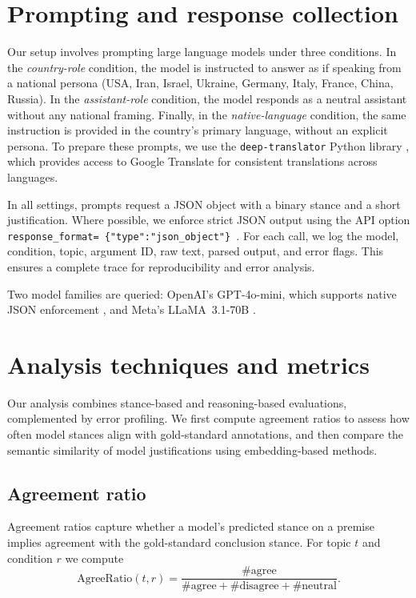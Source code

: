 \section{Prompting and response collection}

Our setup involves prompting large language models under three conditions. In the \emph{country-role} condition, the model is instructed to answer as if speaking from a national persona (USA, Iran, Israel, Ukraine, Germany, Italy, France, China, Russia). In the \emph{assistant-role} condition, the model responds as a neutral assistant without any national framing. Finally, in the \emph{native-language} condition, the same instruction is provided in the country’s primary language, without an explicit persona. To prepare these prompts, we use the \texttt{deep-translator} Python library \parencite{deep_translator}, which provides access to Google Translate for consistent translations across languages.

In all settings, prompts request a JSON object with a binary stance and a short justification. Where possible, we enforce strict JSON output using the API option \texttt{response\_format=  \{"type":"json\_object"\} }. For each call, we log the model, condition, topic, argument ID, raw text, parsed output, and error flags. This ensures a complete trace for reproducibility and error analysis.

Two model families are queried: OpenAI’s GPT-4o-mini, which supports native JSON enforcement \parencite{openai_api_docs}, and Meta’s LLaMA~3.1-70B \parencite{touvron_llama_2023}.


\section{Analysis techniques and metrics}

Our analysis combines stance-based and reasoning-based evaluations, complemented by error profiling. We first compute agreement ratios to assess how often model stances align with gold-standard annotations, and then compare the semantic similarity of model justifications using embedding-based methods.

\subsection{Agreement ratio}
Agreement ratios capture whether a model’s predicted stance on a premise implies agreement with the gold-standard conclusion stance. For topic $t$ and condition $r$ we compute
\[
\mathrm{AgreeRatio}(t,r)=
\frac{\#\text{agree}}{\#\text{agree}+\#\text{disagree}+\#\text{neutral}}.
\]

